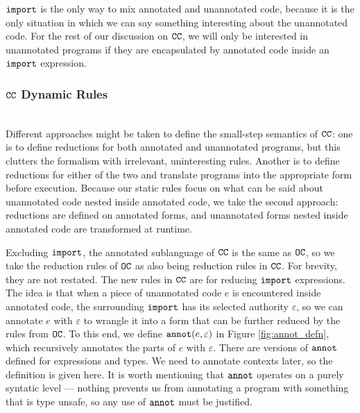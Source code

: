  $\mathtt{import}$ is the only way to mix annotated and unannotated code, because it is the only situation in which we can say something interesting about the unannotated code. For the rest of our discussion on $\mathtt{CC}$, we will only be interested in unannotated programs if they are encapsulated by annotated code inside an $\mathtt{import}$ expression.\\

\subsubsection{$\mathtt{CC}$ Dynamic Rules}~\\

Different approaches might be taken to define the small-step semantics of $\mathtt{CC}$: one is to define reductions for both annotated and unannotated programs, but this clutters the formalism with irrelevant, uninteresting rules. Another is to define reductions for either of the two and translate programs into the appropriate form before execution. Because our static rules focus on what can be said about unannotated code nested inside annotated code, we take the second approach: reductions are defined on annotated forms, and unannotated forms nested inside annotated code are transformed at runtime.

Excluding $\mathtt{import}$, the annotated sublanguage of $\mathtt{CC}$ is the same as $\mathtt{OC}$, so we take the reduction rules of $\mathtt{OC}$ as also being reduction rules in $\mathtt{CC}$. For brevity, they are not restated. The new rules in $\mathtt{CC}$ are for reducing $\mathtt{import}$ expressions. The idea is that when a piece of unannotated code $e$ is encountered inside annotated code, the surrounding $\mathtt{import}$ has its selected authority $\varepsilon$, so we can annotate $e$ with $\varepsilon$ to wrangle it into a form that can be further reduced by the rules from $\mathtt{OC}$. To this end, we define $\mathtt{annot}(e, \varepsilon)$ in Figure \ref{fig:annot_defn}, which recursively annotates the parts of $e$ with $\varepsilon$. There are versions of $\mathtt{annot}$ defined for expressions and types. We need to annotate contexts later, so the definition is given here. It is worth mentioning that $\mathtt{annot}$ operates on a purely syntatic level --- nothing prevents us from annotating a program with something that is type unsafe, so any use of $\mathtt{annot}$ must be justified.

